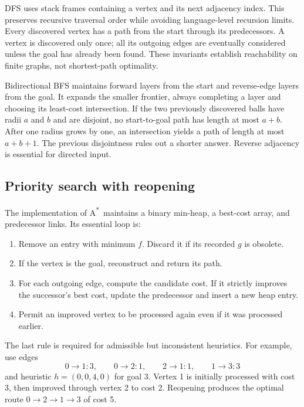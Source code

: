 \documentclass[11pt,a4paper]{article}
\newcommand{\astar}{A\textsuperscript{*}}
\begin{document}
DFS uses stack frames containing a vertex and its next adjacency index. This preserves recursive traversal order while avoiding language-level recursion limits. Every discovered vertex has a path from the start through its predecessors. A vertex is discovered only once; all its outgoing edges are eventually considered unless the goal has already been found. These invariants establish reachability on finite graphs, not shortest-path optimality.

Bidirectional BFS maintains forward layers from the start and reverse-edge layers from the goal. It expands the smaller frontier, always completing a layer and choosing its least-cost intersection. If the two previously discovered balls have radii $a$ and $b$ and are disjoint, no start-to-goal path has length at most $a+b$. After one radius grows by one, an intersection yields a path of length at most $a+b+1$. The previous disjointness rules out a shorter answer. Reverse adjacency is essential for directed input.

\subsection{Priority search with reopening}
The implementation of \astar\ maintains a binary min-heap, a best-cost array, and predecessor links. Its essential loop is:
\begin{enumerate}
\item Remove an entry with minimum $f$. Discard it if its recorded $g$ is obsolete.
\item If the vertex is the goal, reconstruct and return its path.
\item For each outgoing edge, compute the candidate cost. If it strictly improves the successor's best cost, update the predecessor and insert a new heap entry.
\item Permit an improved vertex to be processed again even if it was processed earlier.
\end{enumerate}
The last rule is required for admissible but inconsistent heuristics. For example, use edges
\[
0\to1:3,\qquad 0\to2:1,\qquad 2\to1:1,\qquad 1\to3:3
\]
and heuristic $h=(0,0,4,0)$ for goal 3. Vertex 1 is initially processed with cost 3, then improved through vertex 2 to cost 2. Reopening produces the optimal route $0\to2\to1\to3$ of cost 5.
\end{document}
